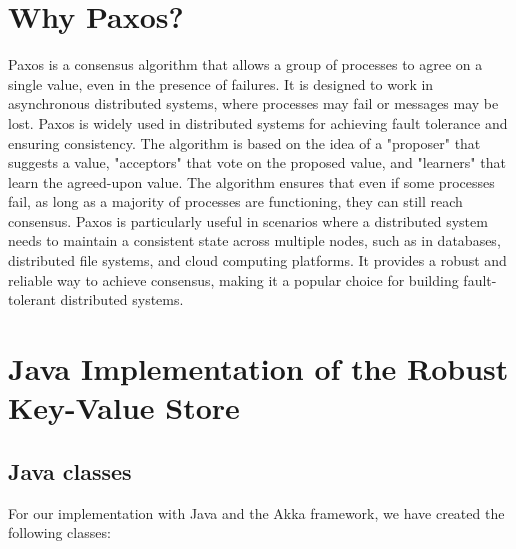 \documentclass{article}
\begin{document}


\tableofcontents
\listoffigures

\newpage

\section{Why Paxos?}
Paxos is a consensus algorithm that allows a group of processes to agree on a single value, even in the presence of failures. It is designed to work in asynchronous distributed systems, where processes may fail or messages may be lost. Paxos is widely used in distributed systems for achieving fault tolerance and ensuring consistency.
The algorithm is based on the idea of a "proposer" that suggests a value, "acceptors" that vote on the proposed value, and "learners" that learn the agreed-upon value. The algorithm ensures that even if some processes fail, as long as a majority of processes are functioning, they can still reach consensus.
Paxos is particularly useful in scenarios where a distributed system needs to maintain a consistent state across multiple nodes, such as in databases, distributed file systems, and cloud computing platforms. It provides a robust and reliable way to achieve consensus, making it a popular choice for building fault-tolerant distributed systems.

\section{Java Implementation of the Robust Key-Value Store}

\subsection{Java classes}
For our implementation with Java and the Akka framework, we have created the following classes:
\end{document}
